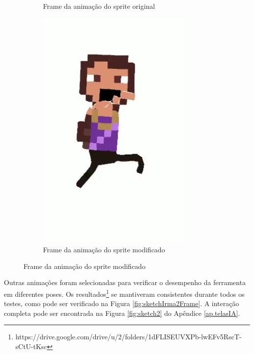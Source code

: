 \begin{figure}[htbp]
\begin{subfigure}{0.35\linewidth}
        \caption{\small Frame da animação do sprite original}
        \label{fig:sketchComparaIrma1}
    \end{subfigure}
    \begin{subfigure}{0.35\linewidth}
        \includegraphics[width=1\linewidth]{figs/sketchLab/irma2_frame2.jpg}
        \caption{\small Frame da animação do sprite modificado}
        \label{fig:sketchComparaIrma2}
    \end{subfigure}

\end{figure}

Outras animações foram selecionadas para verificar o desempenho da ferramenta em diferentes poses. Os resultados\footnote{https://drive.google.com/drive/u/2/folders/1dFLISEUVXPb-lwEFv5RscT-sCtU-tKsc} se mantiveram consistentes durante todos os testes, como pode ser verificado na Figura \ref{fig:sketchIrma2Frame}. A interação completa pode ser encontrada na Figura \ref{fig:sketch2} do Apêndice \ref{ap.telasIA}.

